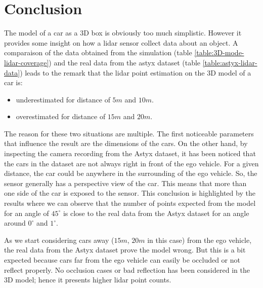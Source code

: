 \documentclass{scrartcl}
\begin{document}
  \section{Conclusion}

  The model of a car as a 3D box is obviously too much simplistic. However
  it provides some insight on how a lidar sensor collect data about an object.
  A comparaison of the data obtained from the simulation (table
  \ref{table:3D-mode-lidar-coverage}) and the real data from the astyx dataset
  (table \ref{table:astyx-lidar-data}) leads to the remark that the lidar point
  estimation on the 3D model of a car is:

  \begin{itemize}
    \item underestimated for distance of $5m$ and $10m$.

    \item overestimated for distance of $15m$ and $20m$.
  \end{itemize}

  The reason for these two situations are multiple. The first noticeable
  parameters that influence the result are the dimensions of the cars.
  On the other hand, by inspecting the camera recording from the Astyx dataset,
  it has been noticed that the cars in the dataset are not always right in
  front of the ego vehicle. For a given distance,
  the car could be anywhere in the surrounding of the ego vehicle.
  So, the sensor generally has a perspective view of the car. This means that
  more than one side of the car is exposed to the sensor.
  This conclusion is highlighted by the results where we can observe that the
  number of points expected from the model for an angle of $45^{\circ}$ is close
  to the real data from the Astyx dataset for an angle around $0^{\circ}$  and
  $1^{\circ}$.

  As we start considering cars away ($15m$, $20m$ in this case) from the ego
  vehicle, the real data from the Astyx dataset prove the model wrong. But this
  is a bit expected because cars far from the ego vehicle can easily be
  occluded or not reflect properly.
  No occlusion cases or bad reflection has been considered in the 3D model;
  hence it presents higher lidar point counts.

  \printbibliography
\end{document}
